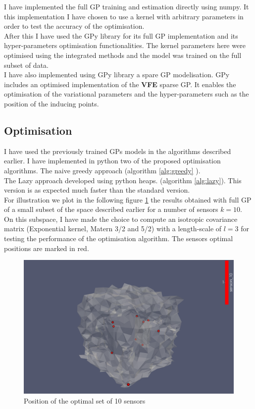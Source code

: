 I have implemented the full GP training and estimation directly using numpy. It this implementation I have chosen to use a kernel with arbitrary parameters in order to test the accuracy of the optimisation. \\

After this I have used the GPy library \citep{gpy_gpy:_2014} for its full GP implementation and its hyper-parameters optimisation functionalities. The kernel parameters here were optimised using the integrated methods and the model was trained on the full subset of data. \\

I have also implemented using GPy library a spare GP modelisation. GPy includes an optimised implementation of the \textbf{VFE} sparse GP. It enables the optimisation of the variational parameters and the hyper-parameters such as the position of the inducing points. 

\subsection{Optimisation}

I have used the previously trained GPs models in the algorithms described earlier. I have implemented in python two of the proposed optimisation algorithms. The naive greedy approach (algorithm \ref{alg:greedy} ). \\
The Lazy approach developed using python heaps. (algorithm \ref{alg:lazy}). This version is as expected much faster than the standard version.  \\ 

For illustration we plot in the following figure \ref{fig:k10_fullGP_results} the results obtained with full GP of a small subset of the space described earlier for a number of sensors $k=10$.  On this subspace, I have made the choice to compute an isotropic covariance matrix (Exponential kernel,  Matern 3/2 and 5/2) with a length-scale of $l=3$ for testing the performance of the optimisation algorithm. The sensors optimal positions are marked in red.  

\begin{figure}[h!]
\centering
  \includegraphics[width=0.8\linewidth]{figures/SensorOpt/sensor10_matern52_15x15x30cube_1}
  \caption{Position of the optimal set of 10 sensors}
  \label{fig:k10_fullGP_results}
\end{figure}




